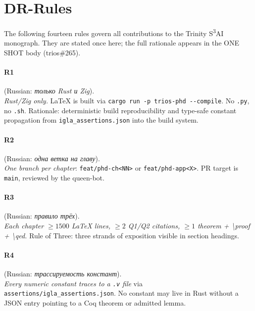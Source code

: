 \bigskip

\section*{D\quad R-Rules}
\label{sec:lexicon-rrules}

\noindent
The following fourteen rules govern all contributions to the
Trinity S\textsuperscript{3}AI monograph.
They are stated once here; the full rationale appears in the
ONE SHOT body (trios\#265).

\paragraph*{\textmd{\textbf{R1}}}
\label{entry:r1}
(Russian: \textit{только Rust и Zig}).\\
\emph{Rust/Zig only.}
LaTeX is built via \texttt{cargo run -p trios-phd -{}-compile}.
No \texttt{.py}, no \texttt{.sh}.
Rationale: deterministic build reproducibility and type-safe
constant propagation from \texttt{igla\_assertions.json} into
the build system.

\paragraph*{\textmd{\textbf{R2}}}
\label{entry:r2}
(Russian: \textit{одна ветка на главу}).\\
\emph{One branch per chapter}: \texttt{feat/phd-ch<NN>} or
\texttt{feat/phd-app<X>}.
PR target is \texttt{main}, reviewed by the queen-bot.

\paragraph*{\textmd{\textbf{R3}}}
\label{entry:r3}
(Russian: \textit{правило трёх}).\\
\emph{Each chapter $\ge 1500$ LaTeX lines, $\ge 2$ Q1/Q2 citations,
$\ge 1$ theorem + \textbackslash proof + \textbackslash qed.}
Rule of Three: three strands of exposition visible in section headings.

\paragraph*{\textmd{\textbf{R4}}}
\label{entry:r4}
(Russian: \textit{трассируемость констант}).\\
\emph{Every numeric constant traces to a \texttt{.v} file}
via \texttt{assertions/igla\_assertions.json}.
No constant may live in Rust without a JSON entry pointing to a Coq
theorem or admitted lemma.

